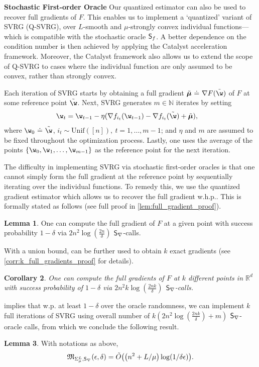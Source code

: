 \documentclass{article}
\theoremstyle{definition}  \newtheorem{exercise}{Exercise}
\newtheorem{lemma}{Lemma}
\theoremstyle{plain}
\newcommand{\pref}[1]{\prettyref{#1}}
\newcommand{\RR}{\mathbb{R}}
\newcommand{\bmu}{\boldsymbol{\mu}}
\DeclarePairedDelimiter{\prn}{(}{)}
\newcommand{\defoo}{~\dot{=}~}
\newcommand{\NN}{\mathbb{N}}
\newcommand{\strcvx}{\mu} \newcommand{\query}{B}
\newtheorem{corr}[lemma]{Corollary}
\theoremstyle{definition}
\theoremstyle{remark}
\begin{document}
	\newcommand{\QSVRG}{Q-SVRG\xspace}
\textbf{Stochastic First-order Oracle\quad }  Our quantized estimator can 
   also be used to recover full gradients of $F$. This enables us to implement a 
   `quantized' variant of SVRG (\QSVRG), over $L$-smooth and 
   $\strcvx$-strongly convex individual 
   functions---which is compatible with the stochastic oracle $\mathsf{S}_{f}$. A 
   better  dependence on the condition number is then 
   achieved by applying the Catalyst acceleration framework. Moreover, the 
   Catalyst framework also allows us to extend the scope of  \QSVRG to cases 
   where the individual function are only assumed to be convex, rather than 
   strongly convex.

Each 
	iteration of SVRG starts by obtaining a full gradient $\tilde{\bmu} \defoo\nabla 
	F(\tilde{\w})$ of $F$ at some 
	reference point $\tilde{\w}$.
Next, SVRG generates $m\in\NN$ iterates by setting 
	\begin{align}
	\w_t &= \w_{t-1} - \eta \prn{\nabla f_{i_t}(\w_{t-1})  - \nabla 
		f_{i_t}(\tilde{\w}) + \tilde{\bmu} },
\end{align}
	where $\w_0\defoo\tilde{\w}$, $i_t\sim 
	\text{Unif}{([n])},~t=1,\dots,m-1$; and $\eta$ and $m$ are 
	assumed to be fixed throughout the optimization process. Lastly, one uses the average of the points
$\{\w_0,\w_1,\dots,\w_{m-1}\}$ as the reference point for 
	the next iteration. 
	
	The difficulty in implementing SVRG via stochastic 
	first-order oracles is that one cannot simply form the full gradient at the 
	reference point by sequentially iterating over the individual functions.  
	To remedy this, we use the quantized gradient estimator which allows us to 
	recover the full gradient w.h.p.. This is formally stated  as follows (see 
	full proof in \ref{lem:full_gradient_proof}).
	\begin{lemma} \label{lem:full_gradient} 
		One can compute the full gradient of $F$ at a given point 
		with success probability  $1-\delta$ via 
		$2n^2\log\left(\frac{2n}{\delta}\right)$ $\mathsf{S}_{\nabla}$-calls. 
	\end{lemma}
	With a union bound, \pref{lem:full_gradient} can be further used to 
	obtain $k$ exact gradients (see \ref{corr:k_full_gradients_proof} for 
	details). 	
	\begin{corr}\label{corr:k_full_gradients}
		One can compute the full gradients of $F$ at $k$ different points in 
		$\RR^d$ with success probability of $1-\delta$ via 	
		$2n^2k\log\left(\frac{2nk}{\delta}\right)$ $\mathsf{S}_{\nabla}$-calls.
	\end{corr}
	\pref{corr:k_full_gradients} implies that w.p. at least $1-\delta$ 
	over the oracle randomness, we can implement $k$ full iterations of 
	SVRG using overall number of 	
	$k(2n^2\log\left(\frac{2nk}{\delta}\right)+m)$ 
	$\mathsf{S}_{\nabla}$-oracle calls, from which we conclude the following result.
	\begin{lemma}\label{lem:svrg_rate}
		With notations as above,
		\begin{align*}
			\comp_{\fsmlL,\orcsfn}(\epsilon,\delta) = 		
			\tilde{O}\prn*{\prn*{n^2+L/\strcvx}\log\prn*{{1}/{\delta\epsilon}}}.
		\end{align*}
	\end{lemma}
		
\end{document}
